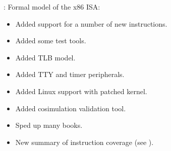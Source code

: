 
\begin{frame}

\implibtitle

:
Formal model of the x86 ISA:
\begin{itemize}
\item Added support for a number of new instructions.
\item Added some test tools.
\item Added TLB model.
\item Added TTY and timer peripherals.
\item Added Linux support with patched kernel.
\item Added cosimulation validation tool.
\item Sped up many books.
\item New summary of instruction coverage (see ).
\end{itemize}

\end{frame}




